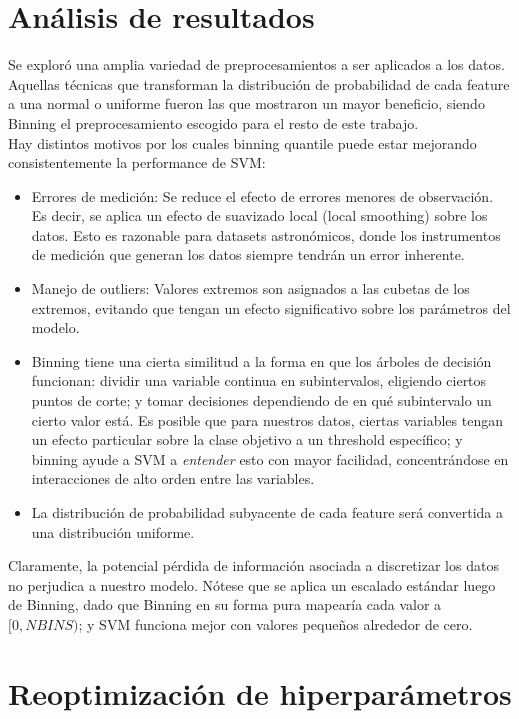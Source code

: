 \section{Análisis de resultados}

Se exploró una amplia variedad de preprocesamientos a ser aplicados a los datos. Aquellas técnicas que transforman la distribución de probabilidad de cada feature a una normal o uniforme fueron las que mostraron un mayor beneficio, siendo Binning el preprocesamiento escogido para el resto de este trabajo. \\

Hay distintos motivos por los cuales binning quantile puede estar mejorando consistentemente la performance de SVM:

\begin{itemize}
\item Errores de medición: Se reduce el efecto de errores menores de observación. Es decir, se aplica un efecto de suavizado local (local smoothing) sobre los datos. Esto es razonable para datasets astronómicos, donde los instrumentos de medición que generan los datos siempre tendrán un error inherente.
\item Manejo de outliers: Valores extremos son asignados a las cubetas de los extremos, evitando que tengan un efecto significativo sobre los parámetros del modelo.
\item Binning tiene una cierta similitud a la forma en que los árboles de decisión funcionan: dividir una variable continua en subintervalos, eligiendo ciertos puntos de corte; y tomar decisiones dependiendo de en qué subintervalo un cierto valor está. Es posible que para nuestros datos, ciertas variables tengan un efecto particular sobre la clase objetivo a un threshold específico; y binning ayude a SVM a \textit{entender} esto con mayor facilidad, concentrándose en interacciones de alto orden entre las variables.
\item La distribución de probabilidad subyacente de cada feature será convertida a una distribución uniforme.
\end{itemize} 

Claramente, la potencial pérdida de información asociada a discretizar los datos no perjudica a nuestro modelo. Nótese que se aplica un escalado estándar luego de Binning, dado que Binning en su forma pura mapearía cada valor a $[0,NBINS)$; y SVM funciona mejor con valores pequeños alrededor de cero. \\

\section{Reoptimización de hiperparámetros}

